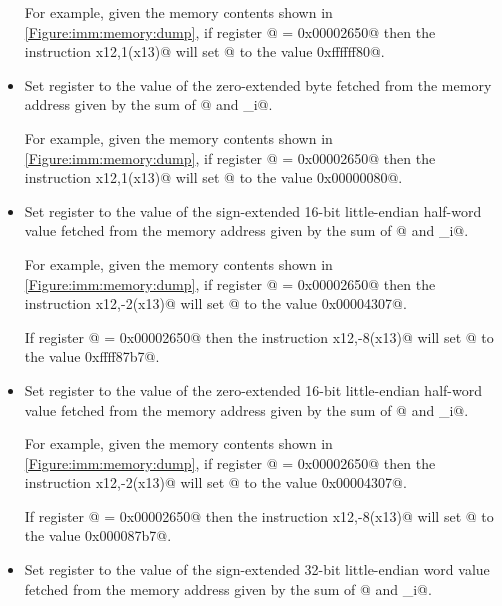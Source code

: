 \begin{itemize}
For example, given the memory contents shown in \autoref{Figure:imm:memory:dump},
if register @ = \verb@0x00002650@ then the instruction
\verb@lb x12,1(x13)@ will set @ to the value \verb@0xffffff80@.

\item{}
\label{insn:lbu}

Set register \verb@rd@ to the value of the zero-extended byte fetched from
the memory address given by the sum of @ and \verb@imm_i@.

For example, given the memory contents shown in \autoref{Figure:imm:memory:dump},
if register @ = \verb@0x00002650@ then the instruction
\verb@lbu x12,1(x13)@ will set @ to the value \verb@0x00000080@.

\item{}
\label{insn:lh}

Set register \verb@rd@ to the value of the sign-extended 16-bit little-endian
half-word value fetched from the memory address given by the sum
of @ and \verb@imm_i@.

For example, given the memory contents shown in \autoref{Figure:imm:memory:dump},
if register @ = \verb@0x00002650@ then the instruction
\verb@lh x12,-2(x13)@ will set @ to the value \verb@0x00004307@.

If register @ = \verb@0x00002650@ then the instruction
\verb@lh x12,-8(x13)@ will set @ to the value \verb@0xffff87b7@.

\item{}
\label{insn:lhu}

Set register \verb@rd@ to the value of the zero-extended 16-bit little-endian
half-word value fetched from the memory address given by the sum
of @ and \verb@imm_i@.

For example, given the memory contents shown in \autoref{Figure:imm:memory:dump},
if register @ = \verb@0x00002650@ then the instruction
\verb@lhu x12,-2(x13)@ will set @ to the value \verb@0x00004307@.

If register @ = \verb@0x00002650@ then the instruction
\verb@lhu x12,-8(x13)@ will set @ to the value \verb@0x000087b7@.

\item{}
\label{insn:lw}

Set register \verb@rd@ to the value of the sign-extended 32-bit little-endian
word value fetched from the memory address given by the sum
of @ and \verb@imm_i@.


\end{itemize}
